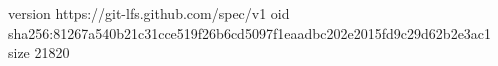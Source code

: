 version https://git-lfs.github.com/spec/v1
oid sha256:81267a540b21c31cce519f26b6cd5097f1eaadbc202e2015fd9c29d62b2e3ac1
size 21820

